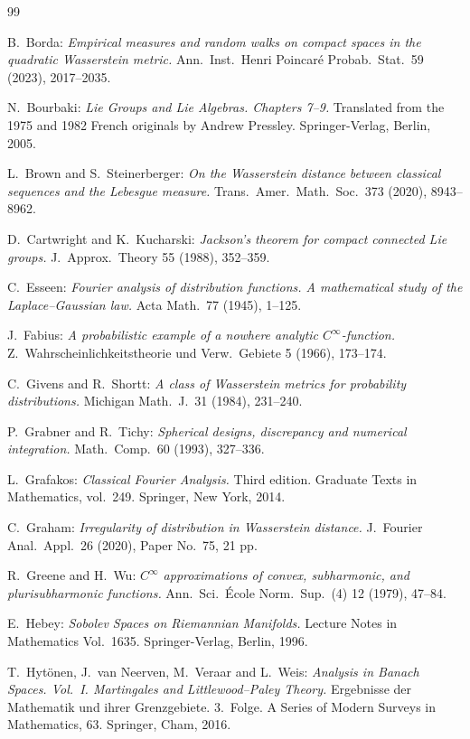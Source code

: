 \documentclass[11pt,a4paper]{article}
\theoremstyle{definition}
\begin{document}
\begin{thebibliography}{99}
{ B.\ Borda: \textit{Empirical measures and random walks on compact spaces in the quadratic Wasserstein metric.} Ann.\ Inst.\ Henri Poincar\'e Probab.\ Stat.\ 59 (2023), 2017--2035.

 N.\ Bourbaki: \textit{Lie Groups and Lie Algebras. Chapters 7--9.} Translated from the 1975 and 1982 French originals by Andrew Pressley. Springer-Verlag, Berlin, 2005.

 L.\ Brown and S.\ Steinerberger: \textit{On the Wasserstein distance between classical sequences and the Lebesgue measure.} Trans.\ Amer.\ Math.\ Soc.\ 373 (2020), 8943--8962.

 D.\ Cartwright and K.\ Kucharski: \textit{Jackson's theorem for compact connected Lie groups.} J.\ Approx.\ Theory 55 (1988), 352--359.

 C.\ Esseen: \textit{Fourier analysis of distribution functions. A mathematical study of the Laplace--Gaussian law.} Acta Math.\ 77 (1945), 1--125.

 J.\ Fabius: \textit{A probabilistic example of a nowhere analytic $C^{\infty}$-function.} Z.\ Wahrscheinlichkeitstheorie und Verw.\ Gebiete 5 (1966), 173--174.

 C.\ Givens and R.\ Shortt: \textit{A class of Wasserstein metrics for probability distributions.} Michigan Math.\ J.\ 31 (1984), 231--240.

 P.\ Grabner and R.\ Tichy: \textit{Spherical designs, discrepancy and numerical integration.} Math.\ Comp.\ 60 (1993), 327--336.

 L.\ Grafakos: \textit{Classical Fourier Analysis.} Third edition. Graduate Texts in Mathematics, vol.\ 249. Springer, New York, 2014.

 C.\ Graham: \textit{Irregularity of distribution in Wasserstein distance.} J.\ Fourier Anal.\ Appl.\ 26 (2020), Paper No.\ 75, 21 pp.

 R.\ Greene and H.\ Wu: \textit{$C^{\infty}$ approximations of convex, subharmonic, and plurisubharmonic functions.} Ann.\ Sci.\ \'Ecole Norm.\ Sup.\ (4) 12 (1979), 47--84.

 E.\ Hebey: \textit{Sobolev Spaces on Riemannian Manifolds.} Lecture Notes in Mathematics Vol.\ 1635. Springer-Verlag, Berlin, 1996.

 T.\ Hyt\"onen, J.\ van Neerven, M.\ Veraar and L.\ Weis: \textit{Analysis in Banach Spaces. Vol.\ I. Martingales and Littlewood--Paley Theory.} Ergebnisse der Mathematik und ihrer Grenzgebiete. 3.\ Folge. A Series of Modern Surveys in Mathematics, 63. Springer, Cham, 2016.

}
\end{thebibliography}
\end{document}
